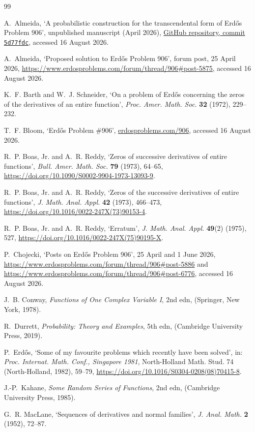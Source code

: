 \documentclass[plain]{baustms}
\theoremstyle{cupthm}
\begin{document}
\begin{thebibliography}{99}

A.~Almeida,
`A probabilistic construction for the transcendental form of Erd\H{o}s
Problem 906', unpublished manuscript (April 2026),
\href{https://github.com/Drill23/erdos-problem-906-proposed-solution/commit/5d77fdc959dc6df150d3c680b338ed7b99653673}
{GitHub repository, commit \texttt{5d77fdc}}, accessed 16 August 2026.

A.~Almeida,
`Proposed solution to Erd\H{o}s Problem 906', forum post, 25 April 2026,
\url{https://www.erdosproblems.com/forum/thread/906#post-5875},
accessed 16 August 2026.

K.~F. Barth and W.~J. Schneider,
`On a problem of Erd\H{o}s concerning the zeros of the derivatives of an
entire function',
\emph{Proc. Amer. Math. Soc.} \textbf{32} (1972), 229--232.

T.~F. Bloom,
`Erd\H{o}s Problem \#906',
\href{https://www.erdosproblems.com/906}{erdosproblems.com/906},
accessed 16 August 2026.

R.~P. Boas, Jr. and A.~R. Reddy,
`Zeros of successive derivatives of entire functions',
\emph{Bull. Amer. Math. Soc.} \textbf{79} (1973), 64--65,
\url{https://doi.org/10.1090/S0002-9904-1973-13093-9}.

R.~P. Boas, Jr. and A.~R. Reddy,
`Zeros of the successive derivatives of entire functions',
\emph{J. Math. Anal. Appl.} \textbf{42} (1973), 466--473,
\url{https://doi.org/10.1016/0022-247X(73)90153-4}.

R.~P. Boas, Jr. and A.~R. Reddy,
`Erratum',
\emph{J. Math. Anal. Appl.} \textbf{49}(2) (1975), 527,
\url{https://doi.org/10.1016/0022-247X(75)90195-X}.

P.~Chojecki,
`Posts on Erd\H{o}s Problem 906', 25 April and 1 June 2026,
\url{https://www.erdosproblems.com/forum/thread/906#post-5886} and
\url{https://www.erdosproblems.com/forum/thread/906#post-6776},
accessed 16 August 2026.

J.~B. Conway,
\emph{Functions of One Complex Variable I}, 2nd edn,
(Springer, New York, 1978).

R.~Durrett,
\emph{Probability: Theory and Examples}, 5th edn,
(Cambridge University Press, 2019).

P.~Erd\H{o}s,
`Some of my favourite problems which recently have been solved',
in: \emph{Proc. Internat. Math. Conf., Singapore 1981},
North-Holland Math. Stud. 74 (North-Holland, 1982), 59--79,
\url{https://doi.org/10.1016/S0304-0208(08)70415-8}.

J.-P.~Kahane,
\emph{Some Random Series of Functions}, 2nd edn,
(Cambridge University Press, 1985).

G.~R. MacLane,
`Sequences of derivatives and normal families',
\emph{J. Anal. Math.} \textbf{2} (1952), 72--87.

\end{thebibliography}
\end{document}

